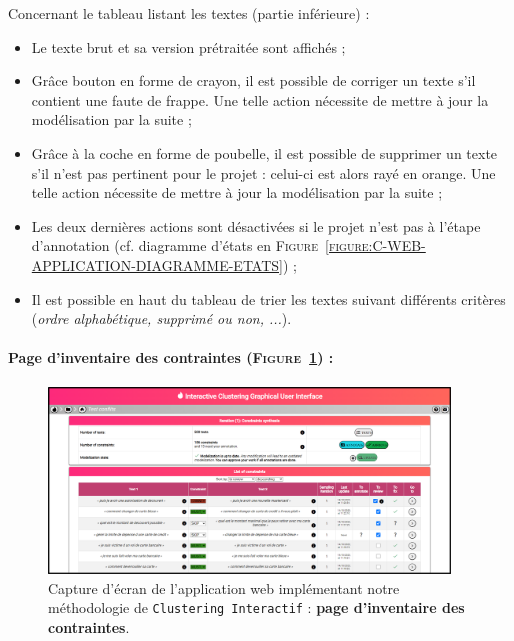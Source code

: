 		Concernant le tableau listant les textes (partie inférieure) :
		\begin{itemize}
			\item Le texte brut et sa version prétraitée sont affichés ;
			\item Grâce bouton en forme de crayon, il est possible de corriger un texte s'il contient une faute de frappe.
			Une telle action nécessite de mettre à jour la modélisation par la suite ;
			\item Grâce à la coche en forme de poubelle, il est possible de supprimer un texte s'il n'est pas pertinent pour le projet : celui-ci est alors rayé en orange.
			Une telle action nécessite de mettre à jour la modélisation par la suite ;
			\item Les deux dernières actions sont désactivées si le projet n'est pas à l'étape d'annotation (cf. diagramme d'états en \textsc{Figure~\ref{figure:C-WEB-APPLICATION-DIAGRAMME-ETATS}}) ;
			\item Il est possible en haut du tableau de trier les textes suivant différents critères (\textit{ordre alphabétique, supprimé ou non, ...}).
		\end{itemize}
	
	
	\newpage
	\paragraph{Page d'inventaire des contraintes (\textsc{Figure~\ref{figure:C-WEB-APPLICATION-INVENTAIRE-CONTRAINTES}}) :}
	
		\begin{figure}[H]
			\centering
			\includegraphics[width=0.95\textwidth]{figures/interactive-clustering-application-contraintes}
			\caption{
				Capture d'écran de l'application web implémentant notre méthodologie de \texttt{Clustering Interactif} : \textbf{page d'inventaire des contraintes}.
			}
			\label{figure:C-WEB-APPLICATION-INVENTAIRE-CONTRAINTES}
		\end{figure}
		
